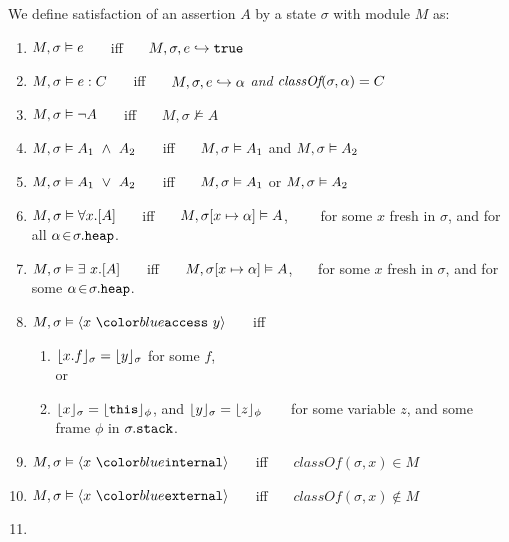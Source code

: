 \begin{definition} 
\label{def:chainmail-semantics}
We define satisfaction of an assertion $A$ by a %
state $\sigma$ with 
 module $M$ as:
\begin{enumerate}
\item
\label{cExpr}
$M , \sigma \vDash e$ \ \ \ iff \ \ \  $M, \sigma, e \hookrightarrow \texttt{true}$
\item
\label{cClass}
$M , \sigma \vDash e : C$ \ \ \ iff \ \ \  $M, \sigma, e \hookrightarrow \alpha$ \textit{and} $\textit{classOf}(\sigma, \alpha) = C$
\item
$M , \sigma \vDash \neg A$ \ \ \ iff \ \ \  ${M},{\sigma}\nvDash{A}$
\item
$\satisfiesA{M}{\sigma}{A_1\ \wedge\ A_2}$ \ \ \ iff \ \ \  $M , \sigma \vDash A_1$ and 
$M , \sigma \vDash A_2$
\item
$\satisfiesA{M}{\sigma}{A_1\ \vee\ A_2}$ \ \ \ iff \ \ \  $M , \sigma \vDash A_1$ or 
$M , \sigma \vDash A_2$
\item
$M , \sigma \vDash \forall x.[A]$ \ \ \ iff \ \ \  
$M , \sigma[x \mapsto \alpha] \vDash A$, \ 
\ \ \ for some $x$ fresh in $\sigma$, and for all $\alpha\!\in\!\sigma.{\texttt{heap}}$.
\item
$M , \sigma \vDash \exists\ x.[A]$ \ \ \ iff \ \ \  
$M , \sigma[x \mapsto \alpha] \vDash A$, \ 
\ \ for some $x$ fresh in $\sigma$, and for some $ \alpha\!\in\!\sigma.{\texttt{heap}}$. 
\item
\label{cAccess}
$\satisfiesA{M}{\sigma}{\access{x}{y}}$ \ \ \ iff \ \ \  
\begin{enumerate}
\item
\label{c1}
$\lfloor x.f \rfloor_{\sigma}={\lfloor y \rfloor_{\sigma}}$ for some $f$, \\
  or
\item
\label{c2}
{$\lfloor x \rfloor_{\sigma}=\lfloor {\texttt{this}} \rfloor_{\phi}$}, {and $\lfloor y \rfloor_{\sigma}=\lfloor z \rfloor_{\phi}$}\ \ \ \
for some variable $z$, and some frame $\phi$ in $\sigma.
{\texttt{stack}}$.
\end{enumerate}
\item
\label{cInternal}
$\satisfiesA{M}{\sigma}{\internal{x}}$ \ \ \ iff \ \ \  
$\textit{classOf}(\sigma,x) \in M$
\item
\label{cExternal}
$\satisfiesA{M}{\sigma}{\external{x}}$ \ \ \ iff \ \ \  
$\textit{classOf}(\sigma,x) \not\in M$
\item

\end{enumerate}
\end{definition}

